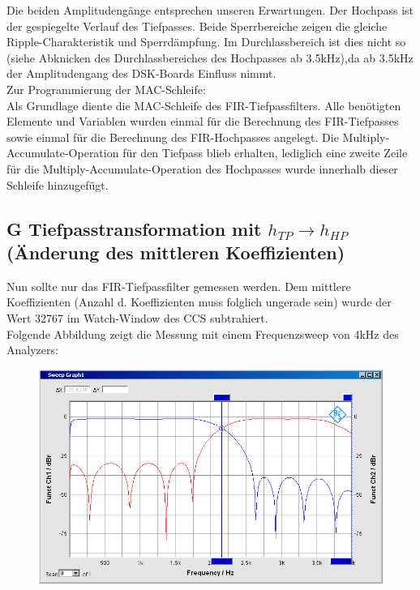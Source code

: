 \noindent Die beiden Amplitudengänge entsprechen unseren Erwartungen. Der Hochpass ist der gespiegelte Verlauf des Tiefpasses. Beide Sperrbereiche zeigen die gleiche Ripple-Charakteristik und Sperrdämpfung.
Im Durchlassbereich ist dies nicht so (siehe Abknicken des Durchlassbereiches des Hochpasses ab 3.5kHz),da ab 3.5kHz der Amplitudengang des DSK-Boards Einfluss nimmt. \\
\noindent Zur Programmierung der MAC-Schleife: \\
\noindent Als Grundlage diente die MAC-Schleife des FIR-Tiefpassfilters. Alle benötigten Elemente und Variablen wurden einmal für die Berechnung des FIR-Tiefpasses sowie einmal für die Berechnung des FIR-Hochpasses angelegt. Die Multiply-Accumulate-Operation für den Tiefpass blieb erhalten, lediglich eine zweite Zeile für die Multiply-Accumulate-Operation des Hochpasses wurde innerhalb dieser Schleife hinzugefügt.

\clearpage

\subsection{G Tiefpasstransformation mit $h_{TP} \rightarrow h_{HP}$ (Änderung des mittleren Koeffizienten)}
\noindent Nun sollte nur das FIR-Tiefpassfilter gemessen werden. Dem mittlere Koeffizienten (Anzahl d. Koeffizienten muss folglich ungerade sein) wurde der Wert 32767 im Watch-Window des CCS subtrahiert.\\
Folgende Abbildung zeigt die Messung mit einem Frequenzsweep von 4kHz des Analyzers:\\

\begin{figure}[h]
\centering
\includegraphics[width=0.7\linewidth]{Bilder/letzteAufgabe}
\caption{}
\label{fig:letzteAufgabe}
\end{figure}

 
